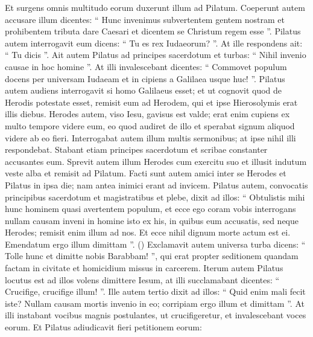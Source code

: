 \begin{biblechapter}
\begin{biblechapter}
\begin{biblechapter}
\begin{biblechapter}
\begin{biblechapter}
\begin{biblechapter}
\begin{biblechapter}
\begin{biblechapter}
\begin{biblechapter}
\begin{biblechapter}
\begin{biblechapter}
\begin{biblechapter}
\begin{biblechapter}
\begin{biblechapter}
\begin{biblechapter}
\begin{biblechapter}
\begin{biblechapter}
\begin{biblechapter}
\begin{biblechapter}
\begin{biblechapter}
\begin{biblechapter}
\begin{biblechapter}
\begin{biblechapter}
\verse Et surgens omnis multitudo eorum duxerunt illum ad Pilatum. 
\verse Coeperunt autem accusare illum dicentes: “ Hunc invenimus subvertentem gentem nostram et prohibentem tributa dare Caesari et dicentem se Christum regem esse ”. 
\verse Pilatus autem interrogavit eum dicens: “ Tu es rex Iudaeorum? ”. At ille respondens ait: “ Tu dicis ”. 
\verse Ait autem Pilatus ad principes sacerdotum et turbas: “ Nihil invenio causae in hoc homine ”. 
\verse At illi invalescebant dicentes: “ Commovet populum docens per universam Iudaeam et in cipiens a Galilaea usque huc! ”. 
\verse Pilatus autem audiens interrogavit si homo Galilaeus esset; 
\verse et ut cognovit quod de Herodis potestate esset, remisit eum ad Herodem, qui et ipse Hierosolymis erat illis diebus. 
\verse Herodes autem, viso Iesu, gavisus est valde; erat enim cupiens ex multo tempore videre eum, eo quod audiret de illo et sperabat signum aliquod videre ab eo fieri. 
\verse Interrogabat autem illum multis sermonibus; at ipse nihil illi respondebat. 
\verse Stabant etiam principes sacerdotum et scribae constanter accusantes eum. 
\verse Sprevit autem illum Herodes cum exercitu suo et illusit indutum veste alba et remisit ad Pilatum. 
\verse Facti sunt autem amici inter se Herodes et Pilatus in ipsa die; nam antea inimici erant ad invicem.
 \verse Pilatus autem, convocatis principibus sacerdotum et magistratibus et plebe, 
\verse dixit ad illos: “ Obtulistis mihi hunc hominem quasi avertentem populum, et ecce ego coram vobis interrogans nullam causam inveni in homine isto ex his, in quibus eum accusatis, 
\verse sed
 neque Herodes; remisit enim illum ad nos. Et ecce nihil dignum morte actum est ei. 
\verse Emendatum ergo illum dimittam ”. 
(\verse) \verse Exclamavit autem universa turba dicens: “ Tolle hunc et dimitte nobis Barabbam! ”, 
\verse qui erat propter seditionem quandam factam in civitate et homicidium missus in carcerem.
 \verse Iterum autem Pilatus locutus est ad illos volens dimittere Iesum, 
\verse at illi succlamabant dicentes: “ Crucifige, crucifige illum! ”. 
\verse Ille autem tertio dixit ad illos: “ Quid enim mali fecit iste? Nullam causam mortis invenio in eo; corripiam ergo illum et dimittam ”. 
\verse At illi instabant vocibus magnis postulantes, ut crucifigeretur, et invalescebant voces eorum. 
\verse Et Pilatus adiudicavit fieri petitionem eorum: 

\end{biblechapter}
\end{biblechapter}
\end{biblechapter}
\end{biblechapter}
\end{biblechapter}
\end{biblechapter}
\end{biblechapter}
\end{biblechapter}
\end{biblechapter}
\end{biblechapter}
\end{biblechapter}
\end{biblechapter}
\end{biblechapter}
\end{biblechapter}
\end{biblechapter}
\end{biblechapter}
\end{biblechapter}
\end{biblechapter}
\end{biblechapter}
\end{biblechapter}
\end{biblechapter}
\end{biblechapter}
\end{biblechapter}
